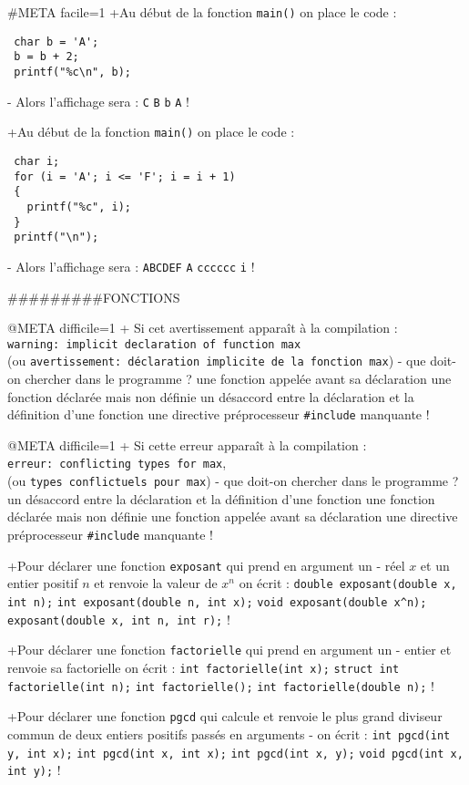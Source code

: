 #META facile=1
+Au début de la fonction \verb|main()| on place le code :
 \begin{verbatim}
 char b = 'A';
 b = b + 2;
 printf("%c\n", b);
\end{verbatim}
- Alors l'affichage sera :
 \verb|C|
 \verb|B|
 \verb|b|
 \verb|A|
!

+Au début de la fonction \verb|main()| on place le code :
 \begin{verbatim}
 char i;
 for (i = 'A'; i <= 'F'; i = i + 1)
 {
   printf("%c", i);
 }
 printf("\n");
\end{verbatim}
- Alors l'affichage sera :
 \verb|ABCDEF|
 \verb|A|
 \verb|cccccc|
 \verb|i|
!

#########FONCTIONS

@META difficile=1
+ Si cet avertissement apparaît à la compilation : \\
 \verb+warning: implicit declaration of function max+\\
 (ou \texttt{avertissement: déclaration implicite de la fonction max}) 
- que doit-on chercher dans le programme ?
  une fonction appelée avant sa déclaration
  une fonction déclarée mais non définie
  un désaccord entre la déclaration et la définition d'une fonction
  une directive préprocesseur \verb+#include+ manquante
!

@META difficile=1
+ Si cette erreur apparaît à la compilation : \\
  \verb+erreur: conflicting types for max+,\\
(ou \verb+types conflictuels pour max+)
- que doit-on chercher dans le programme ?
  un désaccord entre la déclaration et la définition d'une fonction
  une fonction déclarée mais non définie
  une fonction appelée avant sa déclaration
  une directive préprocesseur \verb+#include+ manquante
!

+Pour déclarer une fonction \verb|exposant| qui prend en argument un
- réel $x$ et un entier positif $n$ et renvoie la valeur de $x^n$ on écrit :
 \verb|double exposant(double x, int n);|
 \verb|int exposant(double n, int x);|
 \verb|void exposant(double x^n);|
 \verb|exposant(double x, int n, int r);|
!

+Pour déclarer une fonction \verb|factorielle| qui prend en argument un
- entier et renvoie sa factorielle on écrit :
 \verb|int factorielle(int x);|
 \verb|struct int factorielle(int n);|
 \verb|int factorielle();|
 \verb|int factorielle(double n);|
!

+Pour déclarer une fonction \verb|pgcd| qui calcule et renvoie le plus
  grand diviseur commun de deux entiers positifs passés en arguments 
- on écrit : 
 \verb|int pgcd(int y, int x);|
 \verb|int pgcd(int x, int x);|
 \verb|int pgcd(int x, y);|
 \verb|void pgcd(int x, int y);|
!

